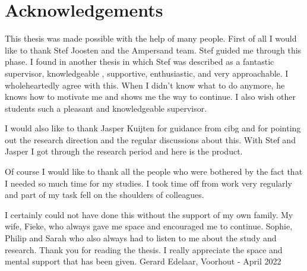 \newpage
\section{Acknowledgements} \label{acknowledgements}

This thesis was made possible with the help of many people.
First of all I would like to thank Stef Joosten and the Ampersand team.
Stef guided me through this phase.
I found in another thesis in which Stef was described as a fantastic supervisor, knowledgeable , supportive, enthusiastic, and very approachable.
I wholeheartedly agree with this.
When I didn't know what to do anymore, he knows how to motivate me and shows me the way to continue.
I also wish other students such a pleasant and knowledgeable supervisor.

I would also like to thank Jasper Kuijten for guidance from \acrshort{cibg} and for pointing out the research direction and the regular discussions about this.
With Stef and Jasper I got through the research period and here is the product.

Of course I would like to thank all the people who were bothered by the fact that I needed so much time for my studies.
I took time off from work very regularly and part of my task fell on the shoulders of colleagues.

I certainly could not have done this without the support of my own family.
My wife, Fieke, who always gave me space and encouraged me to continue.
Sophie, Philip and Sarah who also always had to listen to me about the study and research.
Thank you for reading the thesis.
I really appreciate the space and mental support that has been given.
\newline
\newline
\noindent
Gerard Edelaar, Voorhout - April 2022